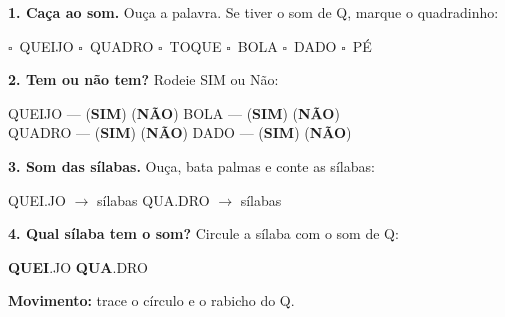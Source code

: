 \begin{somletra}
\textbf{1. Ca\c{c}a ao som.} Ou\c{c}a a palavra. Se tiver o som de Q, marque o quadradinho:
\begin{center}
$\square$~QUEIJO \quad $\square$~QUADRO \quad $\square$~TOQUE \quad $\square$~BOLA \quad $\square$~DADO \quad $\square$~P\'E
\end{center}

\textbf{2. Tem ou n\~ao{} tem?} Rodeie SIM ou N\~ao:
\begin{center}
QUEIJO --- (\textbf{SIM}) (\textbf{N\~AO}) \quad BOLA --- (\textbf{SIM}) (\textbf{N\~AO}) \\ QUADRO --- (\textbf{SIM}) (\textbf{N\~AO}) \quad DADO --- (\textbf{SIM}) (\textbf{N\~AO})
\end{center}
\end{somletra}

\begin{somsilaba}
\textbf{3. Som das s\'ilabas.} Ou\c{c}a, bata palmas e conte as s\'ilabas:
\begin{center}
QUEI.JO $\rightarrow$ \underline{\hspace{1cm}} s\'ilabas \quad QUA.DRO $\rightarrow$ \underline{\hspace{1cm}} s\'ilabas
\end{center}

\textbf{4. Qual s\'ilaba tem o som?} Circule a s\'ilaba com o som de Q:
\begin{center}
\textbf{QUEI}.JO \quad \textbf{QUA}.DRO
\end{center}
\end{somsilaba}



\begin{motricidade}
\textbf{Movimento:} trace o c\'irculo e o rabicho do Q.
\begin{center}
\end{center}
\end{motricidade}


